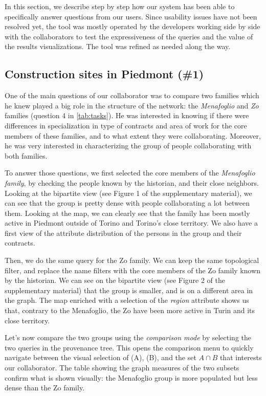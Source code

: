 In this section, we describe step by step how our system has been able to specifically answer questions from our users.
Since usability issues have not been resolved yet, the tool was mostly operated by the developers working side by side with the collaborators to test the expressiveness of the queries and the value of the results visualizations. The tool was refined as needed along the way.

\subsection{Construction sites in Piedmont (\#1)}

One of the main questions of our collaborator was to compare two families which he knew played a big role in the structure of the network: the \textit{Menafoglio} and \textit{Zo} families (question 4 in \autoref{tab:tasks}). He was interested in knowing if there were differences in specialization in type of contracts and area of work for the core members of these families, and to what extent they were collaborating. Moreover, he was very interested in characterizing the group of people collaborating with both families.

To answer those questions, we first selected the core members of the \textit{Menafoglio family}, by checking the people known by the historian, and their close neighbors. Looking at the bipartite view (see Figure 1 of the supplementary material), we can see that the group is pretty dense with people collaborating a lot between them. Looking at the map, we can clearly see that the family has been mostly active in Piedmont outside of Torino and Torino's close territory. We also have a first view of the attribute distribution of the persons in the group and their contracts.

Then, we do the same query for the Zo family. We can keep the same topological filter, and replace the name filters with the core members of the Zo family known by the historian. We can see on the bipartite view (see Figure 2 of the supplementary material) that the group is smaller, and is on a different area in the graph. The map enriched with a selection of the \textit{region} attribute shows us that, contrary to the Menafoglio, the Zo have been more active in Turin and its close territory.

Let's now compare the two groups using the \textit{comparison mode} by selecting the two queries in the provenance tree. This opens the comparison menu to quickly navigate between the visual selection of (A), (B), and the set $A \cap B$ that interests our collaborator. The table showing the graph measures of the two subsets confirm what is shown visually: the Menafoglio group is more populated but less dense than the Zo family.

